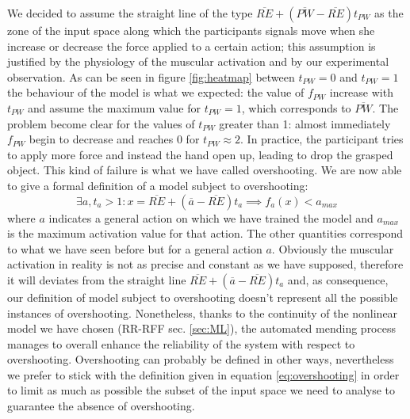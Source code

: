 We decided to assume the straight line of the type $\overline{RE} + (\overline{PW} - \overline{RE})t_{PW}$ as the zone of the input space along which the participants signals move when she increase or decrease the force applied to a certain action; this assumption is justified by the physiology of the muscular activation and by our experimental observation.
As can be seen in figure \ref{fig:heatmap} between $t_{PW} = 0$ and $t_{PW} = 1$ the behaviour of the model is what we expected: the value of $f_{PW}$ increase with $t_{PW}$ and assume the maximum value for $t_{PW} = 1$, which corresponds to $\overline{PW}$. The problem become clear for the values of $t_{PW}$ greater than 1: almost immediately $f_{PW}$ begin to decrease and reaches 0 for $t_{PW} \approx 2$. In practice, the participant tries to apply more force and instead the hand open up, leading to drop the grasped object. This kind of failure is what we have called overshooting.
We are now able to give a formal definition of a model subject to overshooting:
\begin{equation}
    \exists a,t_a>1 : x = \overline{RE} + (\overline{a} - \overline{RE})t_{a} \implies f_a(x) < a_{max}
    \label{eq:overshooting}
\end{equation}
where $a$ indicates a general action on which we have trained the model and $a_{max}$ is the maximum activation value for that action. The other quantities correspond to what we have seen before but for a general action $a$.
Obviously the muscular activation in reality is not as precise and constant as we have supposed, therefore it will deviates from the straight line $\overline{RE} + (\overline{a} - \overline{RE})t_{a}$ and, as consequence, our definition of model subject to overshooting doesn't represent all the possible instances of overshooting. Nonetheless, thanks to the continuity of the nonlinear model we have chosen (RR-RFF sec. \ref{sec:ML}), the automated mending process manages to overall enhance the reliability of the system with respect to overshooting.
Overshooting can probably be defined in other ways, nevertheless we prefer to stick with the definition given in equation \ref{eq:overshooting} in order to limit as much as possible the subset of the input space we need to analyse to guarantee the absence of overshooting.
%
%
%
